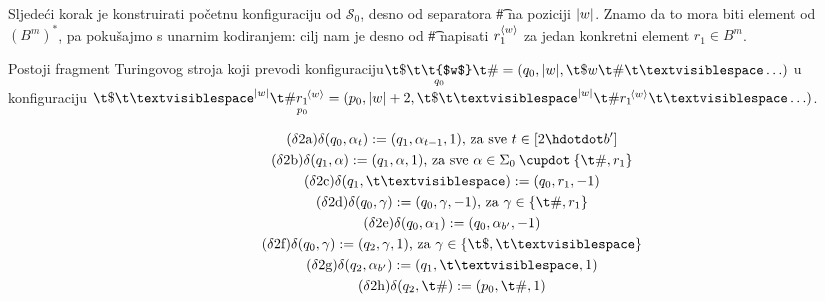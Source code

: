 Sljedeći korak je konstruirati početnu konfiguraciju od $\mathcal S_0$, desno od separatora \t\# na poziciji $\lvert w\rvert$. Znamo da to mora biti element od $(B^m)^*$, pa pokušajmo s unarnim kodiranjem: cilj nam je desno od \t\# napisati $r_1^{\langle w\rangle}$ za jedan konkretni element $r_1\in B^m$. %

\begin{lema}[{name=[drugi fragment transpiliranog stroja]}]\label{lm:faza2}
Postoji fragment Turingovog stroja koji prevodi konfiguraciju\newline $\T{\$}{q_0}{\t{$w$}}{\#}=(q_0,\dulj w,\t\$w\t\#\bl\ldots)$ u konfiguraciju $\t\$\bl^{\dulj w}\t\#\underset{\mathclap{p_0}}{r_1}^{\!\kr w}=(p_0,\dulj w+2,\t\$\bl^{\dulj w}\t\#r_1{}^{\!\kr w}\bl\ldots)$.
\end{lema}
\vspace{-1em}
\noindent\begin{gather*}
    \label{d:21}\tag{$\delta$2a}\delta(q_0,\alpha_t):=(q_1,\alpha_{t-1},1)\text{, za sve }t\in[2\dd b']\\
\label{d:22}\tag{$\delta$2b}\delta(q_1,\alpha):=(q_1,\alpha,1)\text{, za sve }\alpha\in\Sigma_0\mathbin{\dcup}\{\t\#,r_1\}\\
\label{d:23}\tag{$\delta$2c}\delta(q_1,\bl):=(q_0,r_1,-1)\\
\label{d:24}\tag{$\delta$2d}\delta(q_0,\gamma):=(q_0,\gamma,-1)\text{, za }\gamma\in\{\t\#,r_1\}\\
    \label{d:25}\tag{$\delta$2e}\delta(q_0,\alpha_1):=(q_0,\alpha_{b'},-1)\\
\label{d:26}\tag{$\delta$2f}\delta(q_0,\gamma):=(q_2,\gamma,1)\text{, za }\gamma\in\{\t\$,\bl\}\\
\label{d:27}\tag{$\delta$2g}\delta(q_2,\alpha_{b'}):=(q_1,\bl,1)\\
\label{d:28}\tag{$\delta$2h}\delta(q_2,\t\#):=(p_0,\t\#,1)
\end{gather*}
